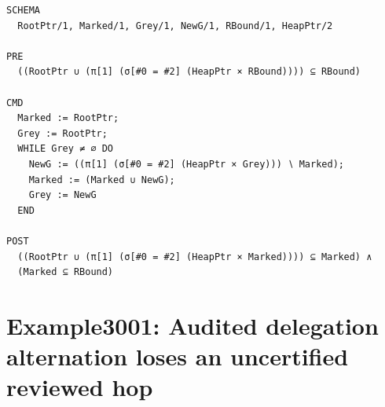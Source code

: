 \documentclass[10pt]{article}
\begin{document}
\begin{Verbatim}[fontsize=\scriptsize,breaklines=true,breakanywhere=true,frame=single,framesep=1.5mm]
SCHEMA
  RootPtr/1, Marked/1, Grey/1, NewG/1, RBound/1, HeapPtr/2

PRE
  ((RootPtr ∪ (π[1] (σ[#0 = #2] (HeapPtr × RBound)))) ⊆ RBound)

CMD
  Marked := RootPtr;
  Grey := RootPtr;
  WHILE Grey ≠ ∅ DO
    NewG := ((π[1] (σ[#0 = #2] (HeapPtr × Grey))) ∖ Marked);
    Marked := (Marked ∪ NewG);
    Grey := NewG
  END

POST
  ((RootPtr ∪ (π[1] (σ[#0 = #2] (HeapPtr × Marked)))) ⊆ Marked) ∧
  (Marked ⊆ RBound)
\end{Verbatim}

\Needspace{0.45\textheight}

\section{Example3001: Audited delegation alternation loses an uncertified reviewed hop}\label{case:Example3001}
\end{document}
